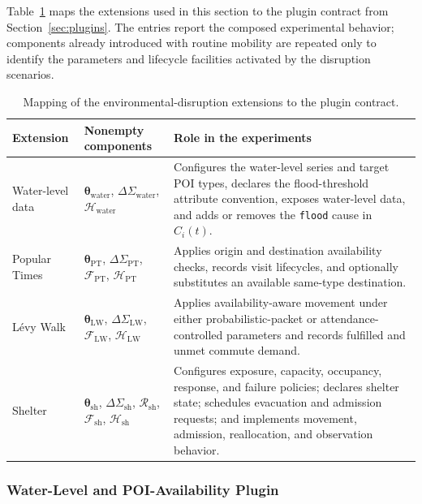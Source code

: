 Table~\ref{tbl:environment_disruption_plugin_contract} maps the extensions used in this section to the plugin contract from Section~\ref{sec:plugins}. The entries report the composed experimental behavior; components already introduced with routine mobility are repeated only to identify the parameters and lifecycle facilities activated by the disruption scenarios.

\begin{table}[ht]
\centering
\footnotesize
\setlength{\tabcolsep}{4pt}
\caption{Mapping of the environmental-disruption extensions to the plugin contract.}
\label{tbl:environment_disruption_plugin_contract}
\begin{tabularx}{\linewidth}{@{}p{2.7cm}p{3.7cm}X@{}}
\toprule
\textbf{Extension} & \textbf{Nonempty components} & \textbf{Role in the experiments} \\
\midrule
Water-level data
& $\bm{\theta}_{\mathrm{water}}$, $\Delta\Sigma_{\mathrm{water}}$, $\mathcal{H}_{\mathrm{water}}$
& Configures the water-level series and target POI types, declares the flood-threshold attribute convention, exposes water-level data, and adds or removes the \texttt{flood} cause in $C_i(t)$. \\
Popular Times
& $\bm{\theta}_{\mathrm{PT}}$, $\Delta\Sigma_{\mathrm{PT}}$, $\mathcal{F}_{\mathrm{PT}}$, $\mathcal{H}_{\mathrm{PT}}$
& Applies origin and destination availability checks, records visit lifecycles, and optionally substitutes an available same-type destination. \\
L\'evy Walk
& $\bm{\theta}_{\mathrm{LW}}$, $\Delta\Sigma_{\mathrm{LW}}$, $\mathcal{F}_{\mathrm{LW}}$, $\mathcal{H}_{\mathrm{LW}}$
& Applies availability-aware movement under either probabilistic-packet or attendance-controlled parameters and records fulfilled and unmet commute demand. \\
Shelter
& $\bm{\theta}_{\mathrm{sh}}$, $\Delta\Sigma_{\mathrm{sh}}$, $\mathcal{R}_{\mathrm{sh}}$, $\mathcal{F}_{\mathrm{sh}}$, $\mathcal{H}_{\mathrm{sh}}$
& Configures exposure, capacity, occupancy, response, and failure policies; declares shelter state; schedules evacuation and admission requests; and implements movement, admission, reallocation, and observation behavior. \\
\bottomrule
\end{tabularx}
\end{table}
\FloatBarrier

\subsubsection{Water-Level and POI-Availability Plugin}

